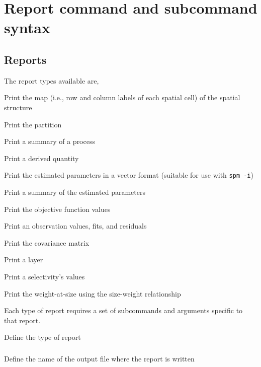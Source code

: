 \section{Report command and subcommand syntax\label{sec:report-syntax}}

\subsection{Reports}

The report types available are,

\begin{description}
  \item Print the map (i.e., row and column labels of each spatial cell) of the spatial structure
  \item Print the partition
  \item Print a summary of a process
  \item Print a derived quantity
  \item Print the estimated parameters in a vector format (suitable for use with \texttt{spm -i})
  \item Print a summary of the estimated parameters
  \item Print the objective function values
  \item Print an observation values, fits, and residuals
  \item Print the covariance matrix
  \item Print a layer
  \item Print a selectivity's values
  \item Print the weight-at-size using the size-weight relationship
\end{description}

Each type of report requires a set of subcommands and arguments specific to that report.


 {Define the type of report}

\subsubsection[Print the map (i.e., row and column labels of each spatial cell) of the spatial structure]{}

 {Define the name of the output file where the report is written}

